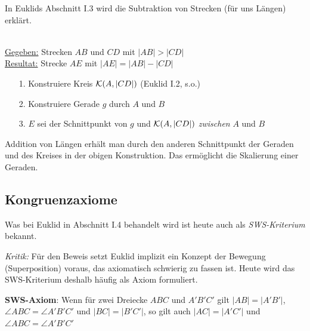 
In Euklids Abschnitt I.3 wird die Subtraktion von Strecken (für uns
Längen) erklärt. 

\begin{konst}
\phantom{Pups}\hspace*{1cm}\phantom{Pups}\\
\underline{Gegeben:} Strecken $AB$ und $CD$ mit  $|AB| > |CD|$ \\ 
\underline{Resultat:} Strecke $AE$ mit $|AE|=|AB|-|CD|$ 
\begin{enumerate}
\item[1.] Konstruiere Kreis ${\mathcal K}(A,|CD|)$ (Euklid I.2, s.o.)
\item[2.] Konstruiere Gerade $g$ durch $A$ und $B$
\item[3.] $E$ sei der Schnittpunkt von $g$ und ${\mathcal K}(A,|CD|)$  {\em zwischen} $A$ und $B$
\end{enumerate}
\end{konst}




Addition von Längen erhält man durch den anderen Schnittpunkt der
Geraden und des Kreises in der obigen Konstruktion. Das ermöglicht die
Skalierung einer Geraden. %






\subsection*{Kongruenzaxiome}

Was bei Euklid in Abschnitt I.4 behandelt wird ist heute auch als 
{\em SWS-Kriterium} bekannt. 

{\em Kritik:}
Für den Beweis setzt Euklid
implizit ein Konzept der Bewegung
(Superposition) voraus, das axiomatisch schwierig zu fassen ist.
Heute wird das SWS-Kriterium deshalb häufig als 
Axiom formuliert.


\medskip

\noindent
{\bf SWS-Axiom}: Wenn für zwei Dreiecke $ABC$ und $A'B'C'$ gilt
$|AB|=|A'B'|$, $\angle ABC = \angle A'B'C'$ und $|BC|=|B'C'|$,
so gilt auch $|AC|=|A'C'|$ und $\angle ABC = \angle A'B'C'$

